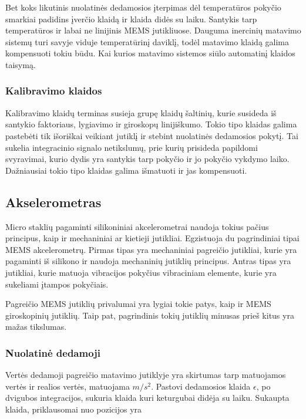Bet koks likutinis nuolatinės dedamosios įterpimas dėl temperatūros pokyčio smarkiai padidins įverčio klaidą ir klaida didės su laiku. Santykis tarp temperatūros ir labai ne linijinis MEMS jutikliuose. Dauguma inercinių matavimo sistemų turi savyje viduje temperatūrinį daviklį, todėl matavimo klaidą galima kompensuoti tokiu būdu. Kai kurios matavimo sistemos siūlo automatinį klaidos taisymą.

\subsubsection{Kalibravimo klaidos}

Kalibravimo klaidų terminas susieja grupę klaidų šaltinių, kurie susideda iš santykio faktoriaus, lygiavimo ir giroskopų linijiškumo. Tokio tipo klaidas galima pastebėti tik išoriškai veikiant jutiklį ir stebint nuolatinės dedamosios pokytį. Tai sukelia integracinio signalo netikslumų, prie kurių prisideda papildomi svyravimai, kurio dydis yra santykis tarp pokyčio ir jo pokyčio vykdymo laiko. Dažniausiai tokio tipo klaidas galima išmatuoti ir jas kompensuoti.


\subsection{Akselerometras}

Micro staklių pagaminti silikoniniai akcelerometrai naudoja tokius pačius principus, kaip ir mechaniniai ar kietieji jutikliai. Egzistuoja du pagrindiniai tipai MEMS akcelerometrų. Pirmas tipas yra mechaniniai pagreičio jutikliai, kurie yra pagaminti iš silikono ir naudoja mechaninių jutiklių principus. Antras tipas yra jutikliai, kurie matuoja vibracijos pokyčius vibraciniam elemente, kurie yra sukeliami įtampos pokyčiais.

Pagreičio MEMS jutiklių privalumai yra lygiai tokie patys, kaip ir MEMS giroskopinių jutiklių. Taip pat, pagrindinis tokių jutiklių minusas prieš kitus yra mažas tikslumas. 

\subsubsection{Nuolatinė dedamoji}

Vertės dedamoji pagreičio matavimo jutiklyje yra skirtumas tarp matuojamos vertės ir realios vertės, matuojama $m/s^2$. Pastovi dedamosios klaida $\epsilon$, po dvigubos integracijos, sukuria klaida kuri keturgubai didėja su laiku. Sukaupta klaida, priklausomai nuo pozicijos yra

